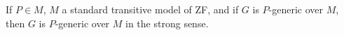 If $P \in M$, $M$ a standard transitive model of ZF, and if $G$ is $P$-generic over $M$, then $G$ is $P$-generic over $M$ in the strong sense.
